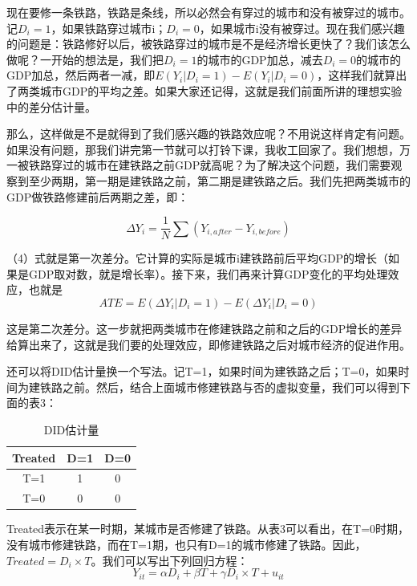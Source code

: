\documentclass[cn,12pt,math=newtx,citestyle=gb7714-2015,bibstyle=gb7714-2015]{elegantbook}
\begin{document}
	现在要修一条铁路，铁路是条线，所以必然会有穿过的城市和没有被穿过的城市。记$D_i=1$，如果铁路穿过城市i；$D_i=0$，如果城市i没有被穿过。现在我们感兴趣的问题是：铁路修好以后，被铁路穿过的城市是不是经济增长更快了？我们该怎么做呢？一开始的想法是，我们把$D_i=1$的城市的GDP加总，减去$D_i=0$的城市的GDP加总，然后两者一减，即$E(Y_i\big|D_i=1)-E(Y_i\big|D_i=0)$，这样我们就算出了两类城市GDP的平均之差。如果大家还记得，这就是我们前面所讲的理想实验中的差分估计量。
	
	那么，这样做是不是就得到了我们感兴趣的铁路效应呢？不用说这样肯定有问题。如果没有问题，那我们讲完第一节就可以打铃下课，我收工回家了。我们想想，万一被铁路穿过的城市在建铁路之前GDP就高呢？为了解决这个问题，我们需要观察到至少两期，第一期是建铁路之前，第二期是建铁路之后。我们先把两类城市的GDP做铁路修建前后两期之差，即：
	
	\begin{equation}
		\Delta{Y}_i=\frac{1}{N}\sum{(Y_{i,after}-Y_{i,before})}
	\end{equation}
	
	（4）式就是第一次差分。它计算的实际是城市i建铁路前后平均GDP的增长（如果是GDP取对数，就是增长率）。接下来，我们再来计算GDP变化的平均处理效应，也就是
	\begin{equation}
		ATE=E(\Delta{Y}_i\big|D_i=1)-E(\Delta{Y}_i\big|D_i=0)
	\end{equation}
	
	这是第二次差分。这一步就把两类城市在修建铁路之前和之后的GDP增长的差异给算出来了，这就是我们要的处理效应，即修建铁路之后对城市经济的促进作用。
	
	还可以将DID估计量换一个写法。记T=1，如果时间为建铁路之后；T=0，如果时间为建铁路之前。然后，结合上面城市修建铁路与否的虚拟变量，我们可以得到下面的表3：
	
	\begin{center}
		\begin{table}[!h]
			\caption{DID估计量}\label{tab:digit}
			\begin{center}
				\begin{tabular}{|c|c|c|}
					\hline
					Treated&D=1&D=0\\
					\hline
					T=1&1&0\\
					\hline
					T=0&0&0\\
					\hline
				\end{tabular}
			\end{center}
		\end{table}
	\end{center}
	
	Treated表示在某一时期，某城市是否修建了铁路。从表3可以看出，在T=0时期，没有城市修建铁路，而在T=1期，也只有D=1的城市修建了铁路。因此，$Treated=D_i\times{T}$。我们可以写出下列回归方程：
	\begin{equation}
		Y_{it}=\alpha{D}_i+\beta{T}+\gamma{D_i\times{T}}+u_{it}
	\end{equation}
	
\end{document}
